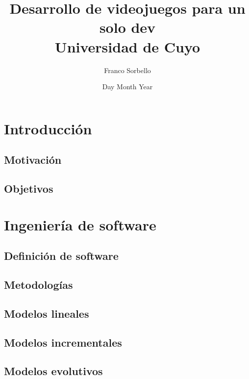 \documentclass[12pt]{report}
\title{
    {Desarrollo de videojuegos para un solo dev}\\
    {\large Universidad de Cuyo}\\
}
\author{Franco Sorbello}
\date{Day Month Year}
\begin{document}
\maketitle
\tableofcontents
% 
%
\chapter{Introducción}

\section{Motivación}


\section{Objetivos}


% 
%
\chapter{Ingeniería de software}

\section{Definición de software}


\section{Metodologías} %


\section{Modelos lineales}


\section{Modelos incrementales}


\section{Modelos evolutivos}

\end{document}
